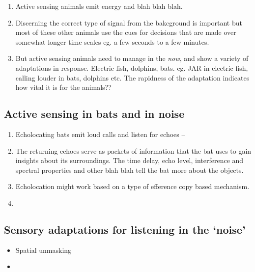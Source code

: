 \documentclass[
]{book}
\begin{document}
\begin{enumerate}
\def\labelenumi{\arabic{enumi}.}
\item
  Active sensing animals emit energy and blah blah blah.
\item
  Discerning the correct type of signal from the bakcground is important but most of these other animals use the cues for decisions that are made over somewhat longer time scales eg. a few seconds to a few minutes.
\item
  But active sensing animals need to manage in the \emph{now}, and show a variety of adaptations in response. Electric fish, dolphins, bats. eg. JAR in electric fish, calling louder in bats, dolphins etc. The rapidness of the adaptation indicates how vital it is for the animals??
\end{enumerate}

\hypertarget{active-sensing-in-bats-and-in-noise}{%
\subsection{Active sensing in bats and in noise}\label{active-sensing-in-bats-and-in-noise}}

\begin{enumerate}
\def\labelenumi{\arabic{enumi}.}
\item
  Echolocating bats emit loud calls and listen for echoes --
\item
  The returning echoes serve as packets of information that the bat uses to gain insights about its surroundings. The time delay, echo level, interference and spectral properties and other blah blah tell the bat more about the objects.
\item
  Echolocation might work based on a type of efference copy based mechanism.
\item
\end{enumerate}

\hypertarget{sensory-adaptations-for-listening-in-the-noise}{%
\subsection{Sensory adaptations for listening in the `noise'}\label{sensory-adaptations-for-listening-in-the-noise}}

\begin{itemize}
\item
  Spatial unmasking
\item
\end{itemize}
\end{document}

